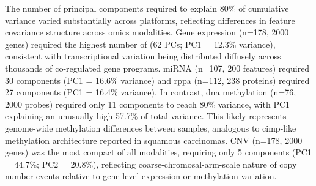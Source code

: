 The number of principal components required to explain 80\% of cumulative variance varied substantially across platforms, reflecting differences in feature covariance structure across omics modalities. Gene expression (n=178, 2000 genes) required the highest number of (62 PCs; PC1 = 12.3\% variance), consistent with transcriptional variation being distributed diffusely across thousands of co-regulated gene programs. miRNA (n=107, 200 features) required 30 components (PC1 = 16.6\% variance) and \gls{rppa} (n=112, 238 proteins) required 27 components (PC1 = 16.4\% variance). In contrast, \gls{dna} methylation (n=76, 2000 probes) required only 11 components to reach 80\% variance, with PC1 explaining an unusually high 57.7\% of total variance. This likely represents genome-wide methylation differences between samples, analogous to \gls{cimp}-like methylation architecture reported in squamous carcinomas. CNV (n=178, 2000 genes) was the most compact of all modalities, requiring only 5 components (PC1 = 44.7\%; PC2 = 20.8\%), reflecting coarse-chromosal-arm-scale nature of copy number events relative to gene-level expression or methylation variation.

